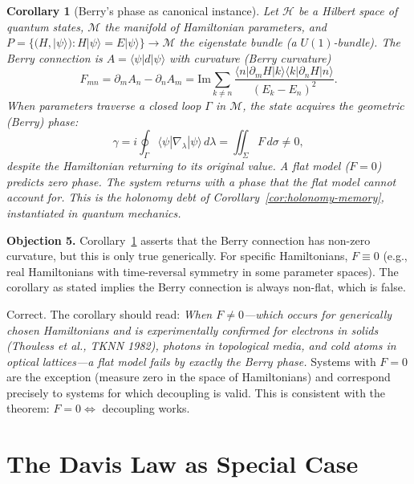 \documentclass[12pt]{amsart}
\theoremstyle{plain}
\newtheorem{corollary}[theorem]{Corollary}
\theoremstyle{definition}
\begin{document}
\begin{corollary}[Berry's phase as canonical instance]
\label{cor:berry}
Let $\mathcal{H}$ be a Hilbert space of quantum states, $\mathcal{M}$ the
manifold of Hamiltonian parameters, and $P = \{(H,|\psi\rangle) :
H|\psi\rangle = E|\psi\rangle\} \to \mathcal{M}$ the eigenstate bundle
(a $U(1)$-bundle). The Berry connection is $A = \langle \psi |
d|\psi\rangle$ with curvature (Berry curvature)
\[
  F_{mn} = \partial_m A_n - \partial_n A_m
  = \mathrm{Im}\sum_{k\neq n}
    \frac{\langle n|\partial_m H|k\rangle\langle k|\partial_n H|n\rangle}{(E_k - E_n)^2}.
\]
When parameters traverse a closed loop $\Gamma$ in $\mathcal{M}$, the state
acquires the geometric (Berry) phase:
\[
  \gamma = i\oint_\Gamma \langle \psi | \nabla_\lambda | \psi\rangle\,d\lambda
  = \iint_\Sigma F\,d\sigma \neq 0,
\]
despite the Hamiltonian returning to its original value. A flat model
($F = 0$) predicts zero phase. The system returns with a phase that the
flat model cannot account for. This is the holonomy debt of
Corollary~\ref{cor:holonomy-memory}, instantiated in quantum mechanics.
\end{corollary}

\begin{auditbox}
\textbf{Objection 5.} Corollary~\ref{cor:berry} asserts that the Berry
connection has non-zero curvature, but this is only true generically.
For specific Hamiltonians, $F \equiv 0$ (e.g., real Hamiltonians with
time-reversal symmetry in some parameter spaces). The corollary as stated
implies the Berry connection is always non-flat, which is false.
\end{auditbox}

\begin{replybox}
Correct. The corollary should read: \emph{When $F \neq 0$---which occurs
for generically chosen Hamiltonians and is experimentally confirmed for
electrons in solids (Thouless et al., TKNN 1982), photons in topological
media, and cold atoms in optical lattices---a flat model fails by
exactly the Berry phase.} Systems with $F = 0$ are the exception (measure
zero in the space of Hamiltonians) and correspond precisely to systems for
which decoupling is valid. This is consistent with the theorem: $F = 0
\Leftrightarrow$ decoupling works.
\end{replybox}

\section{The Davis Law as Special Case}
\label{sec:davis-law}
\end{document}
